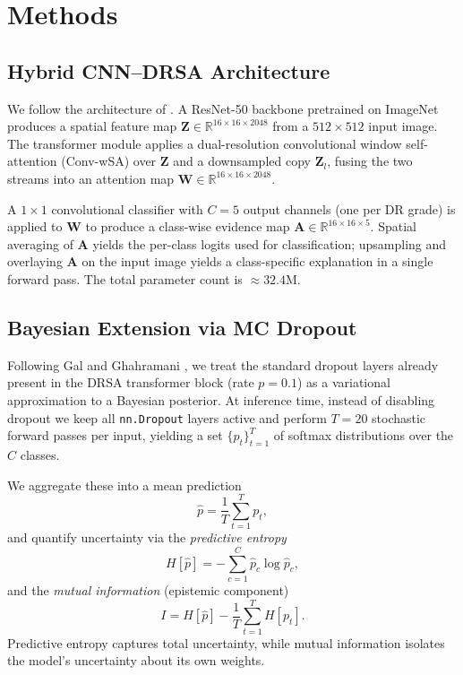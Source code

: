\documentclass[conference]{IEEEtran}
\begin{document}
\section{Methods}

\subsection{Hybrid CNN--DRSA Architecture}
We follow the architecture of \cite{djoumessi2025hybrid}. A ResNet-50 backbone \cite{he2016deep} pretrained on ImageNet produces a spatial feature map $\mathbf{Z}\in\mathbb{R}^{16\times16\times2048}$ from a $512\times512$ input image. The transformer module applies a dual-resolution convolutional window self-attention (Conv-wSA) over $\mathbf{Z}$ and a downsampled copy $\mathbf{Z}_l$, fusing the two streams into an attention map $\mathbf{W}\in\mathbb{R}^{16\times16\times2048}$.

A $1\times1$ convolutional classifier with $C{=}5$ output channels (one per DR grade) is applied to $\mathbf{W}$ to produce a class-wise evidence map $\mathbf{A}\in\mathbb{R}^{16\times16\times5}$. Spatial averaging of $\mathbf{A}$ yields the per-class logits used for classification; upsampling and overlaying $\mathbf{A}$ on the input image yields a class-specific explanation in a single forward pass. The total parameter count is $\approx 32.4$M.

\subsection{Bayesian Extension via MC Dropout}
Following Gal and Ghahramani \cite{gal2016dropout}, we treat the standard dropout layers already present in the DRSA transformer block (rate $p{=}0.1$) as a variational approximation to a Bayesian posterior. At inference time, instead of disabling dropout we keep all \texttt{nn.Dropout} layers active and perform $T{=}20$ stochastic forward passes per input, yielding a set $\{p_t\}_{t=1}^{T}$ of softmax distributions over the $C$ classes.

We aggregate these into a mean prediction
\begin{equation}
\hat{p} = \frac{1}{T}\sum_{t=1}^{T} p_t,
\end{equation}
and quantify uncertainty via the \emph{predictive entropy}
\begin{equation}
H[\hat{p}] = -\sum_{c=1}^{C} \hat{p}_c \log \hat{p}_c,
\end{equation}
and the \emph{mutual information} (epistemic component)
\begin{equation}
I = H[\hat{p}] - \frac{1}{T}\sum_{t=1}^{T} H[p_t].
\end{equation}
Predictive entropy captures total uncertainty, while mutual information isolates the model's uncertainty about its own weights.
\end{document}
